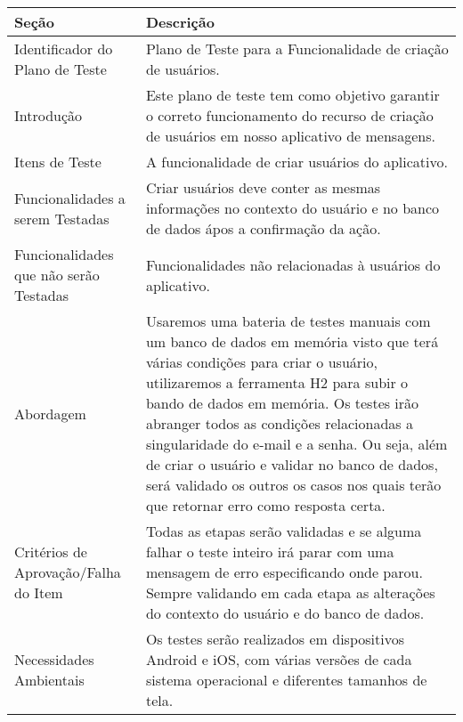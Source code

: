         \begin{tabularx}{\textwidth}{|X|X|}
            \hline
            Seção & Descrição \\
            \hline
            Identificador do Plano de Teste & Plano de Teste para a Funcionalidade de criação de usuários. \\
            \hline
            Introdução & Este plano de teste tem como objetivo garantir o correto funcionamento do recurso de criação de usuários em nosso aplicativo de mensagens. \\
            \hline
            Itens de Teste & A funcionalidade de criar usuários do aplicativo. \\
            \hline
            Funcionalidades a serem Testadas & Criar usuários deve conter as mesmas informações no contexto do usuário e no banco de dados ápos a confirmação da ação. \\
            \hline
            Funcionalidades que não serão Testadas & Funcionalidades não relacionadas à usuários do aplicativo. \\
            \hline
            Abordagem & Usaremos uma bateria de testes manuais com um banco de dados em memória visto que terá várias condições para criar o usuário, utilizaremos a ferramenta H2 para subir o bando de dados em memória. Os testes irão abranger todos as condições relacionadas a singularidade do e-mail e a senha. Ou seja, além de criar o usuário e validar no banco de dados, será validado os outros os casos nos quais terão que retornar erro como resposta certa. \\
            \hline
            Critérios de Aprovação/Falha do Item & Todas as etapas serão validadas e se alguma falhar o teste inteiro irá parar com uma mensagem de erro especificando onde parou. Sempre validando em cada etapa as alterações do contexto do usuário e do banco de dados. \\
            \hline
            Necessidades Ambientais & Os testes serão realizados em dispositivos Android e iOS, com várias versões de cada sistema operacional e diferentes tamanhos de tela. \\
            \hline
        \end{tabularx}

